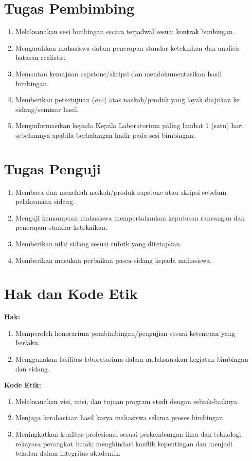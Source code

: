 \documentclass[12pt,a4paper]{report}
\begin{document}
\section{Tugas Pembimbing}
\begin{enumerate}
\item Melaksanakan sesi bimbingan secara terjadwal sesuai kontrak bimbingan.
\item Mengarahkan mahasiswa dalam penerapan standar keteknikan dan analisis batasan realistis.
\item Memantau kemajuan capstone/skripsi dan mendokumentasikan hasil bimbingan.
\item Memberikan persetujuan (\emph{acc}) atas naskah/produk yang layak diajukan ke sidang/seminar hasil.
\item Menginformasikan kepada Kepala Laboratorium paling lambat 1 (satu) hari sebelumnya apabila berhalangan hadir pada sesi bimbingan.
\end{enumerate}

\section{Tugas Penguji}
\begin{enumerate}
\item Membaca dan menelaah naskah/produk capstone atau skripsi sebelum pelaksanaan sidang.
\item Menguji kemampuan mahasiswa mempertahankan keputusan rancangan dan penerapan standar keteknikan.
\item Memberikan nilai sidang sesuai rubrik yang ditetapkan.
\item Memberikan masukan perbaikan pasca-sidang kepada mahasiswa.
\end{enumerate}

\section{Hak dan Kode Etik}
\textbf{Hak:}
\begin{enumerate}
\item Memperoleh honorarium pembimbingan/pengujian sesuai ketentuan yang berlaku.
\item Menggunakan fasilitas laboratorium dalam melaksanakan kegiatan bimbingan dan sidang.
\end{enumerate}
\textbf{Kode Etik:}
\begin{enumerate}
\item Melaksanakan visi, misi, dan tujuan program studi dengan sebaik-baiknya.
\item Menjaga kerahasiaan hasil karya mahasiswa selama proses bimbingan.
\item Meningkatkan kualitas profesional sesuai perkembangan ilmu dan teknologi rekayasa perangkat lunak; menghindari konflik kepentingan dan menjadi teladan dalam integritas akademik.
\end{enumerate}
\end{document}
